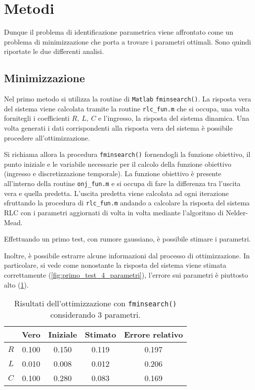 \section{Metodi}

Dunque il problema di identificazione parametrica viene affrontato come un problema di minimizzazione che porta a trovare i parametri ottimali. Sono quindi riportate le due differenti analisi.


\subsection{Minimizzazione}

Nel primo metodo si utilizza la routine di \texttt{Matlab} \texttt{fminsearch()}. La risposta vera del sistema viene calcolata tramite la routine \texttt{rlc\_fun.m} che si occupa, una volta fornitegli i coefficienti $R,\:L,\:C$ e l'ingresso, la risposta del sistema dinamica. Una volta generati i dati corrispondenti alla risposta vera del sistema è possibile procedere all'ottimizzazione. 

Si richiama allora la procedura \texttt{fminsearch()} fornendogli la funzione obiettivo, il punto iniziale e le variabile necessarie per il calcolo della funzione obiettivo (ingresso e discretizzazione temporale). La funzione obiettivo è presente all'interno della routine \texttt{onj\_fun.m} e si occupa di fare la differenza tra l'uscita vera e quella predetta. L'uscita predetta viene calcolata ad ogni iterazione sfruttando la procedura di \texttt{rlc\_fun.m} andando a calcolare la risposta del sistema RLC con i parametri aggiornati di volta in volta mediante l'algoritmo di Nelder-Mead. 

Effettuando un primo test, con rumore gaussiano, è possibile stimare i parametri. 

Inoltre, è possibile estrarre alcune informazioni dal processo di ottimizzazione. In particolare, si vede come nonostante la risposta del sistema viene stimata correttamente (\cref{fig:primo_test_4_parametri}), l'errore sui parametri è piuttosto alto (\cref{tab:test_3_param}).

\begin{table}
\begin{tabular}{|c|c|c|c|c|}
	\hline
	& Vero & Iniziale & Stimato & Errore relativo \\
	\hline
	$R$ & 0.100 & 0.150 & 0.119 & 0.197 \\
	\hline
	$L$ &  0.010 & 0.008 & 0.012 & 0.206 \\
	\hline
	$C$ & 0.100 & 0.280 & 0.083 & 0.169 \\
	\hline
\end{tabular}
\caption{Risultati dell'ottimizzazione con \texttt{fminsearch()} considerando 3 parametri.}
\label{tab:test_3_param}
\end{table}

